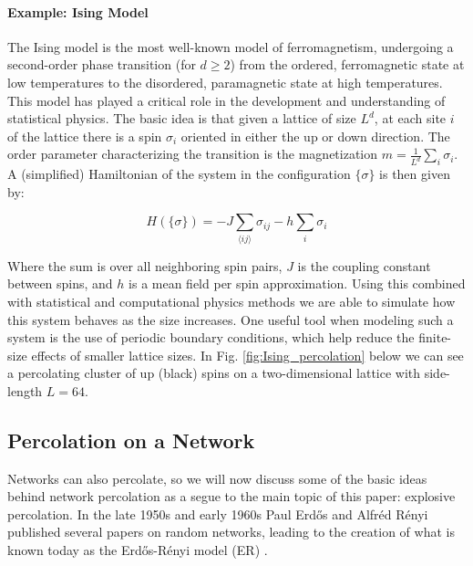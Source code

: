 \paragraph{Example: Ising Model}
The Ising model is the most well-known model of ferromagnetism, undergoing a second-order phase transition (for $d \ge 2$) from the ordered, ferromagnetic state at low temperatures to the disordered, paramagnetic state at high temperatures.
This model has played a critical role in the development and understanding of statistical physics.
The basic idea is that given a lattice of size $L^d$, at each site $i$ of the lattice there is a spin $\sigma_i$ oriented in either the up or down direction.
The order parameter characterizing the transition is the magnetization $m = \frac{1}{L^d} \sum_i \sigma_i$.
A (simplified) Hamiltonian of the system in the configuration $\{\sigma\}$ is then given by:

\begin{equation}
	\label{eqn:Ising_Hamiltonian}
	H(\{\sigma\}) = -J \sum_{\langle i j \rangle} \sigma_{ij} -h \sum_i \sigma_i
\end{equation}

Where the sum is over all neighboring spin pairs, $J$ is the coupling constant between spins, and $h$ is a mean field per spin approximation.
Using this combined with statistical and computational physics methods we are able to simulate how this system behaves as the size increases.
One useful tool when modeling such a system is the use of periodic boundary conditions, which help reduce the finite-size effects of smaller lattice sizes.
In Fig. \ref{fig:Ising_percolation} below we can see a percolating cluster of up (black) spins on a two-dimensional lattice with side-length $L = 64$.










\subsection{Percolation on a Network}
Networks can also percolate, so we will now discuss some of the basic ideas behind network percolation as a segue to the main topic of this paper: explosive percolation.
In the late 1950s and early 1960s Paul Erdős and Alfréd Rényi published several papers on random networks, leading to the creation of what is known today as the Erdős-Rényi model (ER) \cite{ER1} \cite{ER2}.

